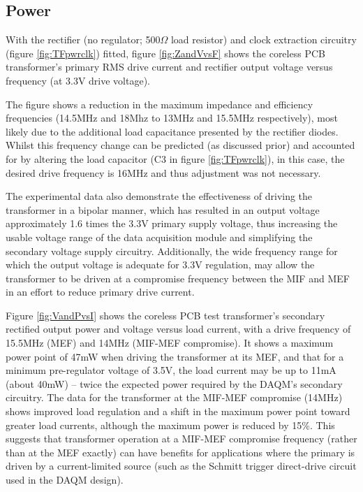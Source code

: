 \documentclass[conference]{IEEEtran}
\begin{document}
	\subsection{Power}
	With the rectifier (no regulator; 500$\Omega$ load resistor) and clock extraction circuitry (figure \ref{fig:TFpwrclk}) fitted, figure \ref{fig:ZandVvsF} shows the coreless PCB transformer's primary RMS drive current and rectifier output voltage versus frequency (at 3.3V drive voltage).
	
	The figure shows a reduction in the maximum impedance and efficiency frequencies (14.5MHz and 18Mhz to 13MHz and 15.5MHz respectively), most likely due to the additional load capacitance presented by the rectifier diodes.  Whilst this frequency change can be predicted (as discussed prior) and accounted for by altering the load capacitor (C3 in figure \ref{fig:TFpwrclk}), in this case, the desired drive frequency is 16MHz and thus adjustment was not necessary.
	
	The experimental data also demonstrate the effectiveness of driving the transformer in a bipolar manner, which has resulted in an output voltage approximately 1.6 times the 3.3V primary supply voltage, thus increasing the usable voltage range of the data acquisition module and simplifying the secondary voltage supply circuitry.  Additionally, the wide frequency range for which the output voltage is adequate for 3.3V regulation, may allow the transformer to be driven at a compromise frequency between the MIF and MEF in an effort to reduce primary drive current.
	
	Figure \ref{fig:VandPvsI} shows the coreless PCB test transformer's secondary rectified output power and voltage versus load current, with a drive frequency of 15.5MHz (MEF) and 14MHz (MIF-MEF compromise).  It shows a maximum power point of 47mW when driving the transformer at its MEF, and that for a minimum pre-regulator voltage of 3.5V, the load current may be up to 11mA (about 40mW) -- twice the expected power required by the DAQM's secondary circuitry.  The data for the transformer at the MIF-MEF compromise (14MHz) shows improved load regulation and a shift in the maximum power point toward greater load currents, although the maximum power is reduced by 15\%.  This suggests that transformer operation at a MIF-MEF compromise frequency (rather than at the MEF exactly) can have benefits for applications where the primary is driven by a current-limited source (such as the Schmitt trigger direct-drive circuit used in the DAQM design).
\end{document}
